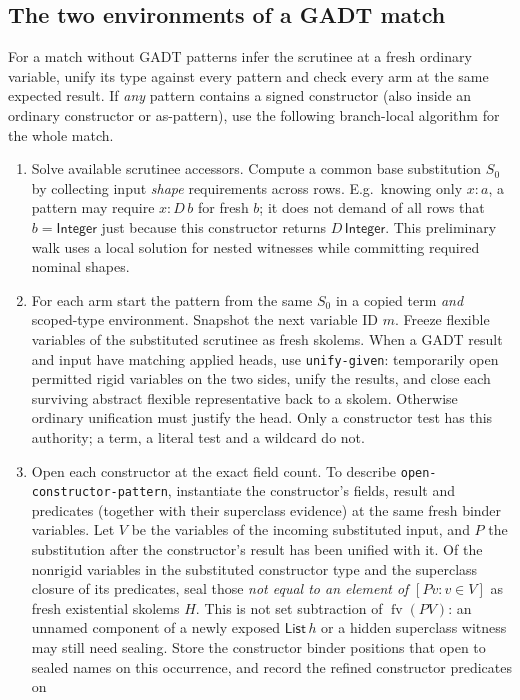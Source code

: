 \documentclass[11pt]{article}
\theoremstyle{definition}
\newcommand{\src}[1]{\nolinkurl{#1}}
\newcommand{\fv}{\operatorname{fv}}
\newcommand{\Int}{\mathsf{Integer}}
\newcommand{\List}{\mathsf{List}}
\begin{document}
\subsection{The two environments of a GADT match}
For a match without GADT patterns infer the scrutinee at a fresh ordinary variable,
unify its type against every pattern and check every arm at the same
expected result. If \emph{any} pattern contains a signed constructor
(also inside an ordinary constructor or as-pattern), use the following
branch-local algorithm for the whole match.
\begin{enumerate}
\item Solve available scrutinee accessors. Compute a common base substitution
$S_0$ by collecting input \emph{shape} requirements across rows. E.g.\
knowing only $x:a$, a pattern may require $x:D\,b$ for fresh $b$;
it does not demand of all rows that $b=\Int$ just because this constructor
returns $D\,\Int$. This preliminary walk uses a local solution for nested
witnesses while committing required nominal shapes.
\item For each arm start the pattern from the same $S_0$ in a copied term
\emph{and} scoped-type environment. Snapshot the next variable ID $m$.
Freeze flexible variables of the substituted scrutinee as fresh skolems.
When a GADT result and input have matching applied heads, use
\src{unify-given}: temporarily open permitted rigid variables on the
two sides, unify the results, and close each surviving abstract flexible
representative back to a skolem. Otherwise ordinary unification must
justify the head. Only a constructor test has this authority; a term,
a literal test and a wildcard do not.
\item Open each constructor at the exact field count. To describe
\src{open-constructor-pattern}, instantiate the constructor's fields,
result and predicates (together with their superclass evidence) at the same
fresh binder variables. Let $V$ be the variables of the incoming
substituted input, and $P$ the substitution after the constructor's result
has been unified with it. Of the nonrigid variables in the substituted
constructor type and the superclass closure of its predicates, seal those
\emph{not equal to an element of} $[Pv:v\in V]$ as fresh existential
skolems $H$. This is not set subtraction of $\fv(PV)$: an unnamed component
of a newly exposed $\List\,h$ or a hidden superclass witness may still
need sealing. Store the constructor binder positions that open to sealed
names on this occurrence, and record the refined constructor predicates on

\end{enumerate}
\end{document}
